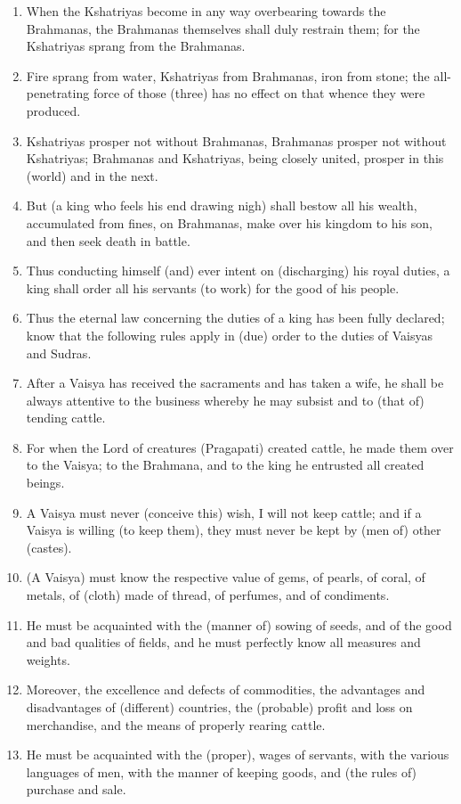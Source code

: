\begin{enumerate}
\item When the Kshatriyas become in any way overbearing towards the Brahmanas, the Brahmanas themselves shall duly restrain them; for the Kshatriyas sprang from the Brahmanas.
\item Fire sprang from water, Kshatriyas from Brahmanas, iron from stone; the all-penetrating force of those (three) has no effect on that whence they were produced.
\item Kshatriyas prosper not without Brahmanas, Brahmanas prosper not without Kshatriyas; Brahmanas and Kshatriyas, being closely united, prosper in this (world) and in the next.
\item But (a king who feels his end drawing nigh) shall bestow all his wealth, accumulated from fines, on Brahmanas, make over his kingdom to his son, and then seek death in battle.
\item Thus conducting himself (and) ever intent on (discharging) his royal duties, a king shall order all his servants (to work) for the good of his people.
\item Thus the eternal law concerning the duties of a king has been fully declared; know that the following rules apply in (due) order to the duties of Vaisyas and Sudras.
\item After a Vaisya has received the sacraments and has taken a wife, he shall be always attentive to the business whereby he may subsist and to (that of) tending cattle.
\item For when the Lord of creatures (Pragapati) created cattle, he made them over to the Vaisya; to the Brahmana, and to the king he entrusted all created beings.
\item A Vaisya must never (conceive this) wish, I will not keep cattle; and if a Vaisya is willing (to keep them), they must never be kept by (men of) other (castes).
\item (A Vaisya) must know the respective value of gems, of pearls, of coral, of metals, of (cloth) made of thread, of perfumes, and of condiments.
\item He must be acquainted with the (manner of) sowing of seeds, and of the good and bad qualities of fields, and he must perfectly know all measures and weights.
\item Moreover, the excellence and defects of commodities, the advantages and disadvantages of (different) countries, the (probable) profit and loss on merchandise, and the means of properly rearing cattle.
\item He must be acquainted with the (proper), wages of servants, with the various languages of men, with the manner of keeping goods, and (the rules of) purchase and sale.

\end{enumerate}

